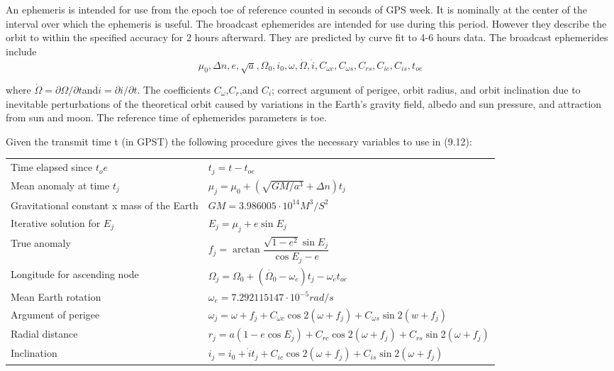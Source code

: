 	An ephemeris is intended for use from the epoch toe of reference counted in seconds of GPS week. It is nominally at the center of the interval over which the ephemeris is useful. The broadcast ephemerides are intended for use during this period. However they describe the orbit to within the specified accuracy for 2 hours afterward. They are predicted by curve fit to 4-6 hours data. The broadcast ephemerides include
	$$\mu_0,\Delta n,e,\sqrt{a},\Omega_0,i_0,\omega,\dot{\Omega},\dot{i},C_{\omega c},C_{\omega s},C_{rs},C_{ic},C_{is},t_{oe}$$
		
	where $\dot{\Omega}=\partial \Omega / \partial t$and$\dot{i}=\partial i / \partial t$. The coefficients $C_\omega$,$C_r$,and $C_i$; correct argument of perigee, orbit radius, and orbit inclination due to inevitable perturbations of the theoretical orbit caused by variations in the Earth’s gravity field, albedo and sun pressure, and attraction from sun and moon. The reference time of ephemerides parameters is toe. 
		
	Given the transmit time t (in GPST) the following procedure gives the necessary variables to use in (9.12):
	\begin{table}
		\begin{tabularx}{\textwidth}{XX}
			\hline Time elapsed since $t_oe$  & $t_j=t-t_{oe}$ \\ 
				   Mean anomaly at time $t_j$ & $\mu_j = \mu_0 + (\sqrt{GM/a^3}+\Delta n)t_j$ \\ 
   Gravitational constant x mass of the Earth & $GM=3.986005\cdot 10^{14}M^3/S^2$ \\ 
				Iterative solution for $E_j$  & $E_j=\mu_j+e\sin E_j$ \\ 
								True anomaly  & $f_j=\arctan \dfrac{\sqrt{1-e^2}\sin E_j}{\cos E_j-e}$ \\ 
				Longitude for ascending node  & $\Omega_j=\Omega_0 + (\dot{\Omega_0}-\omega_e)t_j-\omega_et_{oe}$ \\ 
						 Mean Earth rotation  & $\omega_e=7.292115147\cdot10^{-5}rad/s$ \\ 
						 Argument of perigee  & $\omega_j=\omega+f_j+C_{\omega c}\cos2(\omega+f_j)+C_{\omega s}\sin2(w+f_j)$ \\ 
							 Radial distance  & $r_j = a(1-e\cos E_j)+C_{rc}\cos 2(\omega+f_j)+C_{rs}\sin 2(\omega+f_j)$ \\ 
								 Inclination  & $i_j = i_0+\dot{i}t_j+C_{ic}\cos 2(\omega+f_j)+C_{is}\sin 2(\omega+f_j)$ \\ 
			\hline 
		\end{tabularx} 
	\end{table}
		
